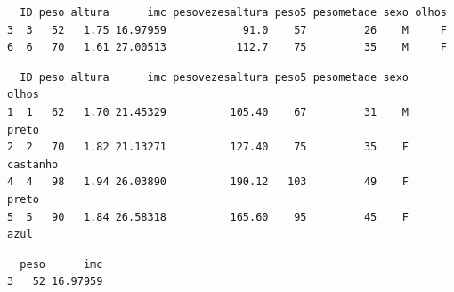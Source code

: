 \documentclass[
  letterpaper,
  DIV=11,
  numbers=noendperiod]{scrreprt}
\newenvironment{Shaded}{\begin{snugshade}}{\end{snugshade}}
\newcommand{\CommentTok}[1]{\textcolor[rgb]{0.37,0.37,0.37}{#1}}
\newcommand{\DecValTok}[1]{\textcolor[rgb]{0.68,0.00,0.00}{#1}}
\newcommand{\FunctionTok}[1]{\textcolor[rgb]{0.28,0.35,0.67}{#1}}
\newcommand{\NormalTok}[1]{\textcolor[rgb]{0.00,0.23,0.31}{#1}}
\newcommand{\SpecialCharTok}[1]{\textcolor[rgb]{0.37,0.37,0.37}{#1}}
\newcommand{\StringTok}[1]{\textcolor[rgb]{0.13,0.47,0.30}{#1}}
\begin{document}
\begin{Shaded}
\end{Shaded}

\begin{verbatim}
  ID peso altura      imc pesovezesaltura peso5 pesometade sexo olhos
3  3   52   1.75 16.97959            91.0    57         26    M     F
6  6   70   1.61 27.00513           112.7    75         35    M     F
\end{verbatim}

\begin{Shaded}
\end{Shaded}

\begin{verbatim}
  ID peso altura      imc pesovezesaltura peso5 pesometade sexo    olhos
1  1   62   1.70 21.45329          105.40    67         31    M    preto
2  2   70   1.82 21.13271          127.40    75         35    F castanho
4  4   98   1.94 26.03890          190.12   103         49    F    preto
5  5   90   1.84 26.58318          165.60    95         45    F     azul
\end{verbatim}

\begin{Shaded}
\end{Shaded}

\begin{verbatim}
  peso      imc
3   52 16.97959
\end{verbatim}
\end{document}
